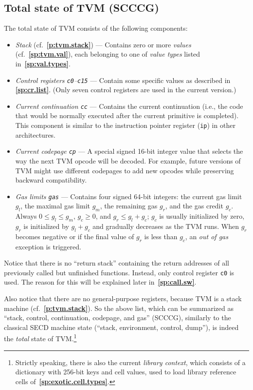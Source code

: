 \documentclass[12pt,oneside]{article}
\def\refpoint#1{{\rm\textbf{\ref{#1}}}}
\let\ptref=\refpoint
\def\mysubsection#1{\subsection{#1}\fancyhead[C]{\small{\textsc{\textrm{\thesubsection.} #1}}}}
\begin{document}
\mysubsection{Total state of TVM (SCCCG)}\label{p:tvm.state}
The total state of TVM consists of the following components:
\begin{itemize}
\item {\em Stack} (cf.~\ptref{p:tvm.stack}) --- Contains zero or more {\em values\/} (cf.~\ptref{sp:tvm.val}), each belonging to one of {\em value types} listed in~\ptref{sp:val.types}.
\item {\em Control registers \texttt{c0}--\texttt{c15}} --- Contain some specific values as described in \ptref{sp:cr.list}. (Only seven control registers are used in the current version.)
\item {\em Current continuation \texttt{cc}} --- Contains the current continuation (i.e., the code that would be normally executed after the current primitive is completed). This component is similar to the instruction pointer register (\texttt{ip}) in other architectures.
\item {\em Current codepage \texttt{cp}} --- A special signed 16-bit integer value that selects the way the next TVM opcode will be decoded. For example, future versions of TVM might use different codepages to add new opcodes while preserving backward compatibility.
\item {\em Gas limits \texttt{gas}} --- Contains four signed 64-bit integers: the current gas limit $g_l$, the maximal gas limit $g_m$, the remaining gas $g_r$, and the gas credit $g_c$. Always $0\leq g_l\leq g_m$, $g_c\geq0$, and $g_r\leq g_l+g_c$; $g_c$ is usually initialized by zero, $g_r$ is initialized by $g_l+g_c$ and gradually decreases as the TVM runs. When $g_r$ becomes negative or if the final value of $g_r$ is less than $g_c$, an {\em out of gas\/} exception is triggered.
\end{itemize}
Notice that there is no ``return stack'' containing the return addresses of all previously called but unfinished functions. Instead, only control register \texttt{c0} is used. The reason for this will be explained later in~\ptref{sp:call.sw}.

Also notice that there are no general-purpose registers, because TVM is a stack machine (cf.~\ptref{p:tvm.stack}). So the above list, which can be summarized as ``stack, control, continuation, codepage, and gas'' (SCCCG), similarly to the classical SECD machine state (``stack, environment, control, dump''), is indeed the {\em total\/} state of TVM.\footnote{Strictly speaking, there is also the current {\em library context}, which consists of a dictionary with 256-bit keys and cell values, used to load library reference cells of~\ptref{sp:exotic.cell.types}.}
\end{document}
